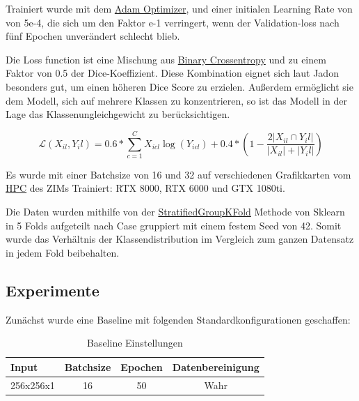 Trainiert wurde mit dem
\href{https://optimization.cbe.cornell.edu/index.php?title=Adam}{Adam Optimizer},
 und einer initialen Learning Rate von von 5e-4, die sich um den Faktor e-1 verringert, wenn der Validation-loss nach fünf Epochen unverändert schlecht blieb. 
 
 Die Loss function ist eine Mischung aus 
\href{https://www.analyticsvidhya.com/blog/2021/03/binary-cross-entropy-log-loss-for-binary-classification/}{Binary Crossentropy} und zu einem Faktor von 0.5 der Dice-Koeffizient. Diese Kombination eignet sich laut Jadon  \citep{Jadon_2020} besonders gut, um einen höheren Dice Score zu erzielen. Außerdem ermöglicht sie dem Modell, sich auf mehrere Klassen zu konzentrieren, so ist das Modell in der Lage das Klassenungleichgewicht zu berücksichtigen. 

\begin{equation}
\mathcal{L}\left(X_{i l},{Y_{i}} l\right)= 0.6 * \sum_{c=1}^{C} X_{i c l} \log \left({Y}_{i c l}\right)+0.4 *\left(1-\frac{2\left|X_{i l} \cap {Y_{i}} l\right|}{\left|X_{i l}\right|+\left|{Y_{i}} l\right|}\right)
\end{equation}

Es wurde mit einer Batchsize von 16 und 32 auf verschiedenen Grafikkarten vom 
\href{https://wiki.hhu.de/display/HPC/Abschlussarbeiten+im+HPC}{HPC} des ZIMs Trainiert: RTX 8000, RTX 6000 und GTX 1080ti.

Die Daten wurden mithilfe von der 
\href{https://scikit-learn.org/stable/modules/generated/sklearn.model_selection.StratifiedGroupKFold.html}{StratifiedGroupKFold} Methode von Sklearn in 5 Folds aufgeteilt nach Case gruppiert mit einem festem Seed von 42. Somit wurde das Verhältnis der Klassendistribution im Vergleich zum ganzen Datensatz in jedem Fold beibehalten. 

\subsection{Experimente}
Zunächst wurde eine Baseline mit folgenden Standardkonfigurationen geschaffen:

\begin{table}[H]
\centering
\begin{tabular}{l|c|c|c}
Input & Batchsize & Epochen & Datenbereinigung \\\hline
256x256x1 & 16 & 50 & Wahr \\
\end{tabular}
\caption{\label{tab:widgets}Baseline Einstellungen}
\end{table}

